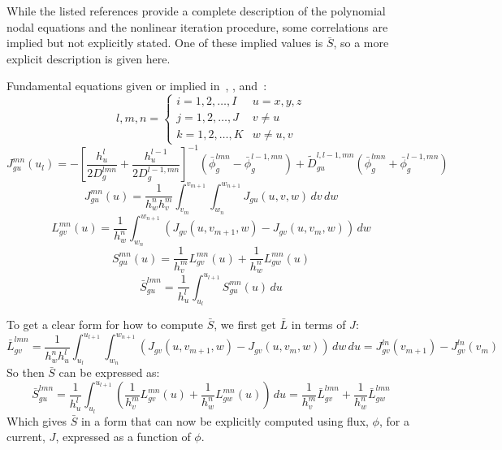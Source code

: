 While the listed references provide a complete description of the polynomial nodal equations and the nonlinear iteration procedure, some correlations are implied but not explicitly stated.
One of these implied values is $\bar{S}$, so a more explicit description is given here.

Fundamental equations given or implied in~\cite{GehinPhD}, \cite{SmithMS}, and~\cite{Smith1983Nonlinear}:
\[
l,m,n=\begin{cases}
i=1,2,\dots,I & u=x,y,z \\
j=1,2,\dots,J & v\neq u \\
k=1,2,\dots,K & w\neq u,v
\end{cases}
\]
\[
J_{gu}^{mn}(u_l)=-\left[\frac{h_u^l}{2D_g^{lmn}}+\frac{h_u^{l-1}}{2D_g^{l-1,mn}}\right]^{-1}\left(\bar{\phi}_g^{lmn}-\bar{\phi}_g^{l-1,mn}\right)+\tilde{D}_{gu}^{l,l-1,mn}\left(\bar{\phi}_g^{lmn}+\bar{\phi}_g^{l-1,mn}\right)
\]
\[
J_{gu}^{mn}(u)=\frac{1}{h_w^nh_v^m}\int_{v_m}^{v_{m+1}}\int_{w_n}^{w_{n+1}}J_{gu}(u,v,w)\,dv\,dw
\]
\[
L_{gv}^{mn}(u)=\frac{1}{h_w^n}\int_{w_n}^{w_{n+1}}\left(J_{gv}(u,v_{m+1},w)-J_{gv}(u,v_{m},w)\right)\,dw
\]
\[
S_{gu}^{mn}(u)=\frac{1}{h_v^m}L_{gv}^{mn}(u)+\frac{1}{h_w^n}L_{gw}^{mn}(u)
\]
\[
\bar{S}_{gu}^{lmn}=\frac{1}{h_u^l}\int_{u_l}^{u_{l+1}}S_{gu}^{mn}(u)\,du
\]

To get a clear form for how to compute $\bar{S}$, we first get $\bar{L}$ in terms of $J$:
\[
  \bar{L}_{gv}^{lmn}=\frac{1}{h_w^nh_u^l}\int_{u_l}^{u_{l+1}}\int_{w_n}^{w_{n+1}}\left(J_{gv}(u,v_{m+1},w)-J_{gv}(u,v_{m},w)\right)\,dw\,du=J_{gv}^{ln}(v_{m+1})-J_{gv}^{ln}(v_{m})
\]
So then $\bar{S}$ can be expressed as:
\[
  \bar{S}_{gu}^{lmn}=\frac{1}{h_u^l}\int_{u_l}^{u_{l+1}}\left(\frac{1}{h_v^m}L_{gv}^{mn}(u)+\frac{1}{h_w^n}L_{gw}^{mn}(u)\right)\,du=\frac{1}{h_v^m}\bar{L}_{gv}^{lmn}+\frac{1}{h_w^n}\bar{L}_{gw}^{lmn}
\]
Which gives $\bar{S}$ in a form that can now be explicitly computed using flux, $\phi$, for a current, $J$, expressed as a function of $\phi$.
